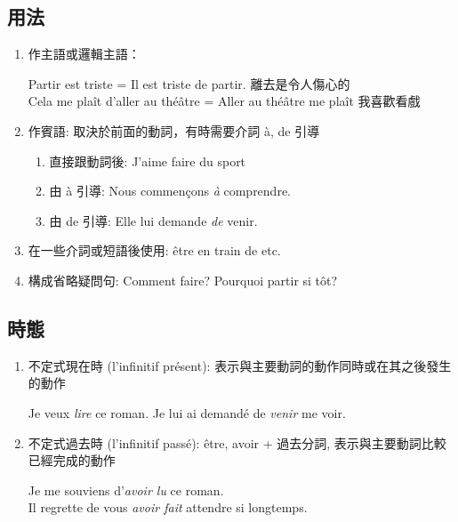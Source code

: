 \documentclass{book}
\begin{document}
        \subsection{用法}
            \begin{enumerate}
                \item 作主語或邏輯主語：
                    \begin{center}
                        Partir est triste = Il est triste de partir. 離去是令人傷心的
                        \\
                        Cela me plaît d'aller au théâtre = Aller au théâtre me plaît 我喜歡看戲
                    \end{center}
                \item 作賓語: 取決於前面的動詞，有時需要介詞 à, de 引導
                    \begin{enumerate}
                        \item 直接跟動詞後: J'aime faire du sport 
                        \item 由 à 引導: Nous commençons \textit{à} comprendre.
                        \item 由 de 引導: Elle lui demande \textit{de} venir.
                    \end{enumerate}
                \item 在一些介詞或短語後使用: être en train de etc.
                \item 構成省略疑問句: Comment faire? Pourquoi partir si tôt?
            \end{enumerate}

        \subsection{時態}
            \begin{enumerate}
                \item 不定式現在時 (l'infinitif présent): 表示與主要動詞的動作同時或在其之後發生的動作
                    \begin{center}
                        Je veux \textit{lire} ce roman. Je lui ai demandé de \textit{venir} me voir.
                    \end{center}
                \item 不定式過去時 (l'infinitif passé): être, avoir + 過去分詞, 表示與主要動詞比較已經完成的動作
                    \begin{center}
                        Je me souviens d'\textit{avoir lu} ce roman.
                        \\
                        Il regrette de vous \textit{avoir fait} attendre si longtemps.
                    \end{center}
            \end{enumerate}
    
\end{document}
